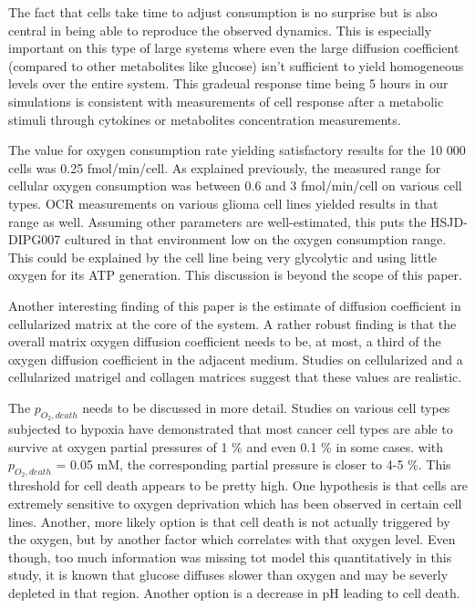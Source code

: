 \documentclass[11pt,a4paper]{article}
\begin{document}
The fact that cells take time to adjust consumption is no surprise but is also central in being able to reproduce the observed dynamics. This is especially important on this type of large systems where even the large diffusion coefficient (compared to other metabolites like glucose) isn't sufficient to yield homogeneous levels over the entire system. This gradeual response time being 5 hours in our simulations is consistent with measurements of cell response after a metabolic stimuli through cytokines or metabolites concentration measurements.\cite{Simoes2015}\cite{Puschel2020}

The value for oxygen consumption rate yielding satisfactory results for the 10 000 cells was 0.25 fmol/min/cell. As explained previously, the measured range for cellular oxygen consumption was between  0.6 and 3 fmol/min/cell on various cell types.\cite{Wagner2011} OCR measurements on various glioma cell lines yielded results in that range as well.\cite{Ruas2018}\cite{Shen2024}\cite{Shen2020}\cite{Mbah2022} Assuming other parameters are well-estimated, this puts the HSJD-DIPG007 cultured in that environment low on the oxygen consumption range. This could be explained by the cell line being very glycolytic and using little oxygen for its ATP generation. This discussion is beyond the scope of this paper.

Another interesting finding of this paper is the estimate of diffusion coefficient in cellularized matrix at the core of the system. A rather robust finding is that the overall matrix oxygen diffusion coefficient needs to be, at most, a third of the oxygen diffusion coefficient in the adjacent medium. Studies on cellularized and a cellularized matrigel and collagen matrices suggest that these values are realistic.\cite{Colom2014}

The $p_{O_2,death}$ needs to be discussed in more detail. Studies on various cell types subjected to hypoxia have demonstrated that most cancer cell types are able to survive at oxygen partial pressures of 1 \% and even 0.1 \% in some cases.\cite{McKeown2014}\cite{Nisar2023}\cite{Cunha2019}\cite{Liu2022} with  $p_{O_2,death}$ = 0.05 mM, the corresponding partial pressure is closer to 4-5 \%. This threshold for cell death appears to be pretty high. One hypothesis is that cells are extremely sensitive to oxygen deprivation which has been observed in certain cell lines.\cite{Griguer2005} Another, more likely option is that cell death is not actually triggered by the oxygen, but by another factor which correlates with that oxygen level. Even though, too much information was missing tot model this quantitatively in this study, it is known that glucose diffuses slower than oxygen and may be severly depleted in that region. Another option is a decrease in pH leading to cell death.
\end{document}
